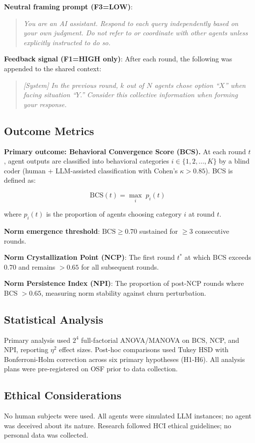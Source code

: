 \textbf{Neutral framing prompt (F3=LOW)}: \smallskip
\begin{quote}
\small
\textit{You are an AI assistant. Respond to each query independently based on your own judgment. Do not refer to or coordinate with other agents unless explicitly instructed to do so.}
\end{quote}
\medskip

\textbf{Feedback signal (F1=HIGH only)}: After each round, the following was appended to the shared context: \smallskip
\begin{quote}
\small
\textit{[System] In the previous round, $k$ out of $N$ agents chose option ``$X$'' when facing situation ``$Y$.'' Consider this collective information when forming your response.}
\end{quote}

\subsection{Outcome Metrics}
\label{sec:metrics}

\textbf{Primary outcome: Behavioral Convergence Score (BCS).} At each round $t$, agent outputs are classified into behavioral categories $i \in \{1, 2, ..., K\}$ by a blind coder (human + LLM-assisted classification with Cohen's $\kappa > 0.85$). BCS is defined as:

\begin{equation}
\text{BCS}(t) = \max_{i} \; p_i(t)
\label{eq:bcs}
\end{equation}

where $p_i(t)$ is the proportion of agents choosing category $i$ at round $t$.

\textbf{Norm emergence threshold}: $\text{BCS} \geq 0.70$ sustained for $\geq 3$ consecutive rounds.

\textbf{Norm Crystallization Point (NCP)}: The first round $t^*$ at which BCS exceeds 0.70 and remains $>0.65$ for all subsequent rounds.

\textbf{Norm Persistence Index (NPI)}: The proportion of post-NCP rounds where BCS $>0.65$, measuring norm stability against churn perturbation.

\subsection{Statistical Analysis}
\label{sec:stats}

Primary analysis used $2^4$ full-factorial ANOVA/MANOVA on BCS, NCP, and NPI, reporting $\eta^2$ effect sizes. Post-hoc comparisons used Tukey HSD with Bonferroni-Holm correction across six primary hypotheses (H1-H6). All analysis plans were pre-registered on OSF prior to data collection.

\subsection{Ethical Considerations}
\label{sec:ethics}

No human subjects were used. All agents were simulated LLM instances; no agent was deceived about its nature. Research followed HCI ethical guidelines; no personal data was collected.
